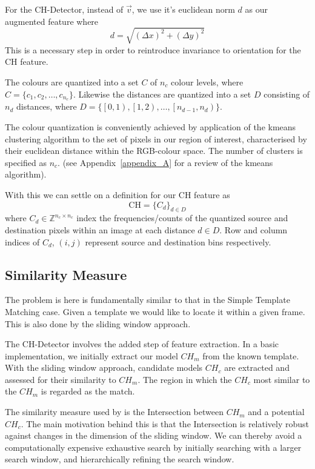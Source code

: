 For the CH-Detector, instead of $\vec{v}$, we use it's euclidean norm $d$ as our
augmented feature where 
$$d = \sqrt{{(\Delta{x})}^2 + {(\Delta{y})}^2}$$ 
This is a necessary step in order to reintroduce invariance to orientation for
the CH feature. 

The colours are quantized into a set $C$ of $n_c$ colour levels, where 
$C = \{c_1,c_2,\dots,c_{n_c}\}$. Likewise the distances are quantized into
a set $D$ consisting of $n_d$ distances, where $D = \{\left[ 0,1
\right),\left[ 1,2\right), \dots , \left[ n_{d-1},n_{d} \right)\}$.

The colour quantization is conveniently achieved by application of the kmeans clustering
algorithm to the set of pixels in our region of interest, characterised by their
euclidean distance within the RGB-colour space. The number of clusters is
specified as $n_c$. (see Appendix~\ref{appendix_A} for a review of the kmeans
algorithm). 

With this we can settle on a definition for our CH feature as
$$\text{CH} = \{C_d\}_{d \in D}$$ 
where $C_d \in \mathbb{Z}^{n_c \times n_c}$ index the
frequencies/counts of the quantized source and destination pixels within an
image at each distance $d \in D$. Row and column indices of
$C_d$, $(i,j)$ represent source and destination bins respectively.  


\subsection{Similarity Measure}\label{theoretical_framework_intersection}
The problem is here is fundamentally similar to that in the Simple Template
Matching case. Given a template we would like to locate it within a given frame.
This is also done by the sliding window approach.

The CH-Detector involves the added step of feature extraction. In a basic
implementation, we initially extract our model $CH_m$ from the known template.
With the sliding window approach, candidate models $CH_c$ are extracted and
assessed for their similarity to $CH_m$. The region in which the $CH_c$ most
similar to the $CH_m$ is regarded as the match. 

The similarity measure used by \cite{Chang1999} is the 
Intersection between $CH_m$ and a potential $CH_c$. The main motivation behind
this is that the Intersection is relatively robust against changes in the
dimension of the sliding window.
We can thereby avoid a computationally expensive exhaustive search by initially
searching with a larger search window, and hierarchically refining the search
window.

